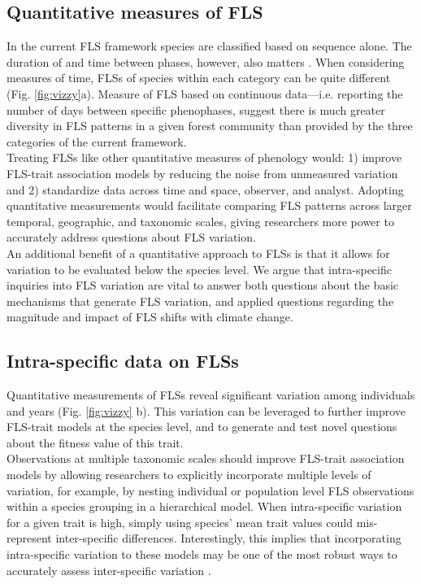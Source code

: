 \documentclass[11pt]{article}
\begin{document}
\subsection*{Quantitative measures of FLS}
\noindent In the current FLS framework species are classified based on sequence alone. The duration of and time between phases, however, also matters \citep{Inouye2019}. When considering measures of time, FLSs of species within each category can be quite different (Fig. \ref{fig:vizzy}a). Measure of FLS based on continuous data---i.e. reporting the number of days between specific phenophases, suggest there is much greater diversity in FLS patterns in a given forest community than provided by the three categories of the current framework.\\ 

\noindent Treating FLSs like other quantitative measures of phenology \citep[e.g. the BBCH scale,][]{Finn2007} would: 1) improve FLS-trait association models by reducing the noise from unmeasured variation and 2) standardize data across time and space, observer, and analyst. Adopting quantitative measurements would facilitate comparing FLS patterns across larger temporal, geographic, and taxonomic scales, giving researchers more power to accurately address questions about FLS variation.\\

\noindent An additional benefit of a quantitative approach to FLSs is that it allows for variation to be evaluated below the species level. We argue that intra-specific inquiries into FLS variation are vital to answer both questions about the basic mechanisms that generate FLS variation, and applied questions regarding the magnitude and impact of FLS shifts with climate change.

\subsection*{Intra-specific data on FLSs}

\noindent Quantitative measurements of FLSs reveal significant variation among individuals and years (Fig. \ref{fig:vizzy} b). This variation can be leveraged to further improve FLS-trait models at the species level, and to generate and test novel questions about the fitness value of this trait.\\

\noindent Observations at multiple taxonomic scales should improve FLS-trait association models by allowing researchers to explicitly incorporate multiple levels of variation, for example, by nesting individual or population level FLS observations within a species grouping in a hierarchical model. When intra-specific variation for a given trait is high, simply using species' mean trait values could mis-represent inter-specific differences. Interestingly, this implies that incorporating intra-specific variation to these models may be one of the most robust ways to accurately assess inter-specific variation \citep{Smith2019}.\\  
\end{document}
